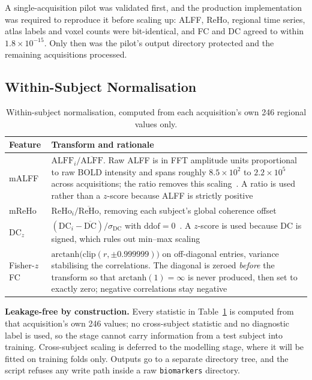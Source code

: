 \documentclass{ssnreview}
\begin{document}
A single-acquisition pilot was validated first, and the production implementation was
required to reproduce it before scaling up: ALFF, ReHo, regional time series, atlas labels
and voxel counts were bit-identical, and FC and DC agreed to within
$1.8 \times 10^{-15}$. Only then was the pilot's output directory protected and the
remaining acquisitions processed.

\subsection{Within-Subject Normalisation}

\begin{table}[!htbp]
\centering
\caption[Within-subject normalisation transforms]{Within-subject normalisation, computed from each acquisition's own 246
regional values only.}
\label{tab:norm}
\small
\begin{tabularx}{\textwidth}{@{}l>{\raggedright\arraybackslash}X@{}}
\toprule
\textbf{Feature} & \textbf{Transform and rationale} \\
\midrule
mALFF & $\mathrm{ALFF}_i / \overline{\mathrm{ALFF}}$. Raw ALFF is in FFT amplitude units
proportional to raw BOLD intensity and spans roughly $8.5\times10^{2}$ to
$2.2\times10^{5}$ across acquisitions; the ratio removes this
scaling~\cite{falff}. A ratio is used rather than a $z$-score because ALFF is
strictly positive \\
mReHo & $\mathrm{ReHo}_i / \overline{\mathrm{ReHo}}$, removing each subject's global
coherence offset \\
DC$_z$ & $(\mathrm{DC}_i - \overline{\mathrm{DC}}) / \sigma_{\mathrm{DC}}$ with
$\mathrm{ddof}=0$~\cite{centrality}. A $z$-score is used because DC is signed, which
rules out min--max scaling \\
Fisher-$z$ FC & $\mathrm{arctanh}\big(\mathrm{clip}(r,\pm0.999999)\big)$ on
off-diagonal entries, variance stabilising the correlations. The diagonal is zeroed
\emph{before} the transform so that $\mathrm{arctanh}(1)=\infty$ is never produced,
then set to exactly zero; negative correlations stay negative \\
\bottomrule
\end{tabularx}
\end{table}

\textbf{Leakage-free by construction.} Every statistic in Table~\ref{tab:norm} is computed
from that acquisition's own 246 values; no cross-subject statistic and no diagnostic label
is used, so the stage cannot carry information from a test subject into training.
Cross-subject scaling is deferred to the modelling stage, where it will be fitted on
training folds only. Outputs go to a separate directory tree, and the script refuses any
write path inside a raw \texttt{biomarkers} directory.
\end{document}

